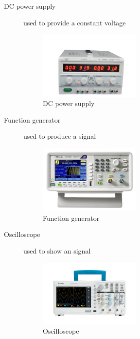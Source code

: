\documentclass[a4paper, 10pt]{article}
\begin{document}
\begin{description}
				\item[DC power supply] used to provide a constant voltage
					\begin{figure}[h!]
						\centering
						\includegraphics[width=0.5\textwidth]{./images/DC-PowerSupply.jpeg}
						\caption{DC power supply}
						\label{fig:DCPowerSupply}
					\end{figure}
				\item[Function generator] used to produce a signal
					\begin{figure}[h!]
						\centering
						\includegraphics[width=0.5\textwidth]{./images/FunctionGenerator.jpeg}
						\caption{Function generator}
						\label{fig:FunctionGenerator}
					\end{figure}

				\item[Oscilloscope] used to show an signal
					\begin{figure}[h!]
						\centering
						\includegraphics[width=0.5\textwidth]{./images/Oscilloscope.jpeg}
						\caption{Oscilloscope}
						\label{fig:Oscilloscope}
					\end{figure}

				\pagebreak


\end{description}
\end{document}
